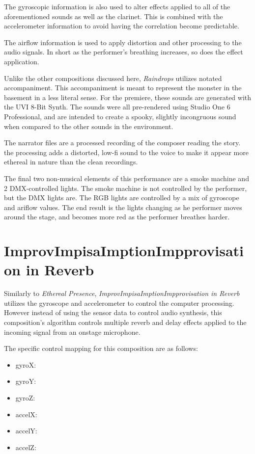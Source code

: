 The gyroscopic information is also used to alter effects applied to all of the aforementioned sounds as well as the clarinet. This is combined with the accelerometer information to avoid having the correlation become predictable.

The airflow information is used to apply distortion and other processing to the audio signals. In short as the performer's breathing increases, so does the effect application.

Unlike the other compositions discussed here, \textit{Raindrops} utilizes notated accompaniment. This accompaniment is meant to represent the monster in the basement in a less literal sense. For the premiere, these sounds are generated with the UVI 8-Bit Synth. The sounds were all pre-rendered using Studio One 6 Professional, and are intended to create a spooky, slightly incongruous sound when compared to the other sounds in the environment. 

The narrator files are a processed recording of the composer reading the story. the processing adds a distorted, low-fi sound to the voice to make it appear more ethereal in nature than the clean recordings. 

The final two non-musical elements of this performance are a smoke machine and 2 DMX-controlled lights. The smoke machine is not controlled by the performer, but the DMX lights are. The RGB lights are controlled by a mix of gyroscope and ariflow values. The end result is the lights changing as he performer moves around the stage, and becomes more red as the performer breathes harder.

\section{ImprovImpisaImptionImpprovisation in Reverb}
Similarly to \textit{Ethereal Presence}, \textit{ImprovImpisaImptionImpprovisation in Reverb} utilizes the gyroscope and accelerometer to control the computer processing. However instead of using the sensor data to control audio synthesis, this composition's algorithm controls multiple reverb and delay effects applied to the incoming signal from an onstage microphone.


The specific control mapping for this composition are as follows: 

\begin{itemize}
    \item gyroX:
    \item gyroY:
    \item gyroZ:
    \item accelX: 
    \item accelY: 
    \item accelZ:
\end{itemize}

